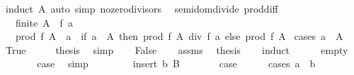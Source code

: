 \begin{isabellebody}
\ {\isacharparenleft}{\kern0pt}induct\ A{\isacharparenright}{\kern0pt}\ {\isacharparenleft}{\kern0pt}auto\ simp{\isacharcolon}{\kern0pt}\ no{\isacharunderscore}{\kern0pt}zero{\isacharunderscore}{\kern0pt}divisors{\isacharparenright}{\kern0pt}%
\endisatagproof
{\isafoldproof}%
%
\isadelimproof
\isanewline
%
\endisadelimproof
\isanewline
{}\isamarkupfalse%
\ {\isacharparenleft}{\kern0pt}\ semidom{\isacharunderscore}{\kern0pt}divide{\isacharparenright}{\kern0pt}\ prod{\isacharunderscore}{\kern0pt}diff{}{\isacharcolon}{\kern0pt}\isanewline
\ \ \ {\isachardoublequoteopen}finite\ A{\isachardoublequoteclose}\ \ {\isachardoublequoteopen}f\ a\ {\isasymnoteq}\ {}{\isachardoublequoteclose}\isanewline
\ \ \ {\isachardoublequoteopen}prod\ f\ {\isacharparenleft}{\kern0pt}A\ {\isacharminus}{\kern0pt}\ {\isacharbraceleft}{\kern0pt}a{\isacharbraceright}{\kern0pt}{\isacharparenright}{\kern0pt}\ {\isacharequal}{\kern0pt}\ {\isacharparenleft}{\kern0pt}if\ a\ {\isasymin}\ A\ then\ prod\ f\ A\ div\ f\ a\ else\ prod\ f\ A{\isacharparenright}{\kern0pt}{\isachardoublequoteclose}\isanewline
%
\isadelimproof
%
\endisadelimproof
%
\isatagproof
{}\isamarkupfalse%
\ {\isacharparenleft}{\kern0pt}cases\ {\isachardoublequoteopen}a\ {\isasymnotin}\ A{\isachardoublequoteclose}{\isacharparenright}{\kern0pt}\isanewline
\ \ \isamarkupfalse%
\ True\isanewline
\ \ \isamarkupfalse%
\ \isamarkupfalse%
\ {\isacharquery}{\kern0pt}thesis\ \isamarkupfalse%
\ simp\isanewline
{}\isamarkupfalse%
\isanewline
\ \ \isamarkupfalse%
\ False\isanewline
\ \ \isamarkupfalse%
\ assms\ \isamarkupfalse%
\ {\isacharquery}{\kern0pt}thesis\isanewline
\ \ \isamarkupfalse%
\ induct\isanewline
\ \ \ \ \isamarkupfalse%
\ empty\isanewline
\ \ \ \ \isamarkupfalse%
\ \isamarkupfalse%
\ {\isacharquery}{\kern0pt}case\ \isamarkupfalse%
\ simp\isanewline
\ \ \isamarkupfalse%
\isanewline
\ \ \ \ \isamarkupfalse%
\ {\isacharparenleft}{\kern0pt}insert\ b\ B{\isacharparenright}{\kern0pt}\isanewline
\ \ \ \ \isamarkupfalse%
\ \isamarkupfalse%
\ {\isacharquery}{\kern0pt}case\isanewline
\ \ \ \ \isamarkupfalse%
\ {\isacharparenleft}{\kern0pt}cases\ {\isachardoublequoteopen}a\ {\isacharequal}{\kern0pt}\ b{\isachardoublequoteclose}{\isacharparenright}{\kern0pt}\isanewline

\end{isabellebody}

